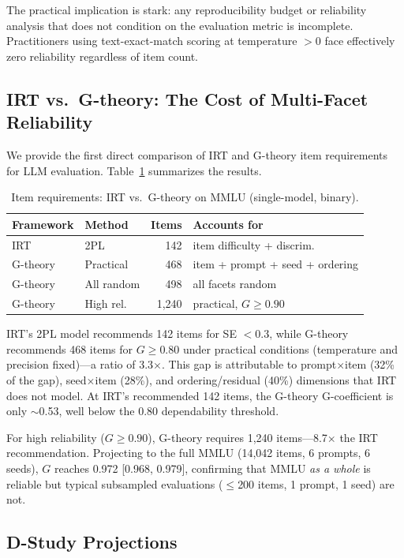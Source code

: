 \documentclass[letterpaper]{article}
\begin{document}
The practical implication is stark: any reproducibility budget or reliability analysis that does not condition on the evaluation metric is incomplete. Practitioners using text-exact-match scoring at temperature $> 0$ face effectively zero reliability regardless of item count.

\subsection{IRT vs.\ G-theory: The Cost of Multi-Facet Reliability}
\label{sec:irt}

We provide the first direct comparison of IRT and G-theory item requirements for LLM evaluation. Table~\ref{tab:irt} summarizes the results.

\begin{table}[t]
\centering
\caption{Item requirements: IRT vs.\ G-theory on MMLU (single-model, binary).}
\label{tab:irt}
\small
\begin{tabular}{llrl}
\toprule
Framework & Method & Items & Accounts for \\
\midrule
IRT & 2PL & 142 & item difficulty + discrim. \\
G-theory & Practical & 468 & item + prompt + seed + ordering \\
G-theory & All random & 498 & all facets random \\
G-theory & High rel. & 1,240 & practical, $G \geq 0.90$ \\
\bottomrule
\end{tabular}
\end{table}

IRT's 2PL model recommends 142 items for SE $< 0.3$, while G-theory recommends 468 items for $G \geq 0.80$ under practical conditions (temperature and precision fixed)---a ratio of 3.3$\times$. This gap is attributable to prompt$\times$item (32\% of the gap), seed$\times$item (28\%), and ordering/residual (40\%) dimensions that IRT does not model. At IRT's recommended 142 items, the G-theory G-coefficient is only $\sim$0.53, well below the 0.80 dependability threshold.

For high reliability ($G \geq 0.90$), G-theory requires 1,240 items---8.7$\times$ the IRT recommendation. Projecting to the full MMLU (14,042 items, 6 prompts, 6 seeds), $G$ reaches 0.972 [0.968, 0.979], confirming that MMLU \emph{as a whole} is reliable but typical subsampled evaluations ($\leq$200 items, 1 prompt, 1 seed) are not.

\subsection{D-Study Projections}
\label{sec:dstudy}
\end{document}
